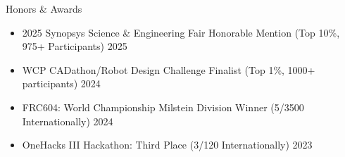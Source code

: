 \documentclass[
  10pt, %
]{resume}
\begin{document}
\begin{rSection}{Honors \& Awards}

  \begin{itemize}
      \setlength\itemsep{-0.7em} %
        
      \item 2025 Synopsys Science \& Engineering Fair Honorable Mention (Top 10\%, 975+ Participants) \hfill 2025
              
      \item WCP CADathon/Robot Design Challenge Finalist (Top 1\%, 1000+ participants) \hfill 2024
              
      \item FRC604: World Championship Milstein Division Winner (5/3500 Internationally) \hfill 2024
              
      \item OneHacks III Hackathon: Third Place (3/120 Internationally) \hfill 2023
              


    \end{itemize}

\end{rSection}
\end{document}
